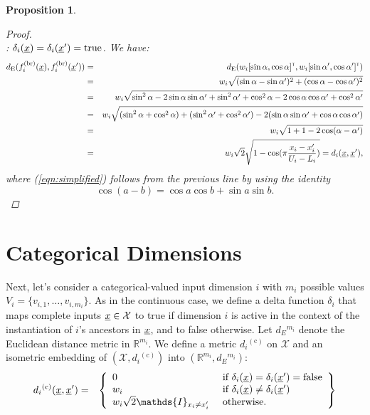 \documentclass[letterpaper]{article}
\newcommand{\vect}[1]{\underline{\smash{#1}}}
\renewcommand{\v}[1]{\vect{#1}}
\newcommand{\reals}{\mathds{R}}
\newcommand{\sX}{\mathcal{X}}
\newcommand{\br}{^{(\text{br})}}
\newcommand{\cat}{^{(\text{c})}}
\newcommand\transpose{{\textrm{\tiny{\sf{T}}}}}
\newtheorem{prop}[thm]{Proposition}
\newcommand{\indicator}{\ensuremath\mathds{I}}
\begin{document}
\begin{prop}
\begin{proof}
~\\: $\delta_i(\v{x}) = \delta_i(\v{x}') = \textrm{true}$. We have:
\begin{eqnarray}
\nonumber{}d_{\text{E}}(f_i\br(\v{x}),f_i\br(\v{x}')) & = & d_{\text{E}}(w_i [\sin{\alpha}, \cos{\alpha}]^\transpose, w_i [\sin{\alpha'}, \cos{\alpha'}]^\transpose)\\ 
\nonumber{}& = & w_i \sqrt{(\sin{\alpha}-\sin{\alpha'})^2+ (\cos{\alpha}-\cos{\alpha'})^2}\\
\nonumber{}& = & w_i \sqrt{\sin^2{\alpha} -2 \sin{\alpha}\sin{\alpha'} + \sin^2{\alpha'}  + \cos^2{\alpha} -2 \cos{\alpha}\cos{\alpha'} + \cos^2{\alpha'} }\\
\nonumber{}& = & w_i \sqrt{(\sin^2{\alpha}+\cos^2{\alpha})   +  (\sin^2{\alpha'}+\cos^2{\alpha'})   -2 (\sin{\alpha}\sin{\alpha'} + \cos{\alpha}\cos{\alpha'})}\\
\label{eqn:simplified}& = & w_i \sqrt{ 1+1-2 \cos(\alpha-\alpha')}\\
\nonumber{}& = & w_i \sqrt{2} \sqrt{1 - \cos(\pi \frac{x_i-x_i'}{U_i-L_i})} = d_i(\v{x}, \v{x}'),
\end{eqnarray}
where (\ref{eqn:simplified}) follows from the previous line by using the identity 
\[\cos{(a-b)} = \cos{a}\cos{b} + \sin{a}\sin{b}.\]
\end{proof}
\end{prop}






\section{Categorical Dimensions}

Next, let's consider a categorical-valued input dimension $i$ with $m_i$ possible values $V_i = \{v_{i,1}, \dots, v_{i,m_i}\}$. As in the continuous case, we define a delta function $\delta_i$ that maps complete inputs $\v{x} \in \sX$ to true if dimension $i$ is active in the context of the instantiation of $i$'s ancestors in $\v{x}$, and to false otherwise. Let $d{_E}^{m_i}$ denote the Euclidean distance metric in $\reals^{m_i}$. We define a metric $d{_i}\cat$ on $\sX$ and an isometric embedding of $(\sX, d{_i}\cat)$ into $(\reals^{m_i},d{_E}^{m_i})$:
\begin{eqnarray}
\nonumber{}d{_i}\cat(\v{x}, \v{x}') & = & \left\{\begin{array}{ll}
\nonumber{} 0 & \textrm{ if } \delta_i(\v{x}) = \delta_i(\v{x}') = \textrm{false}\\
\nonumber{} w_i & \textrm{ if } \delta_i(\v{x}) \neq \delta_i(\v{x}')\\
\nonumber{} w_i \sqrt{2} \indicator_{x_i \neq x_i'} & \textrm{ otherwise. }\end{array}\right\}
\end{eqnarray}
\end{document}
